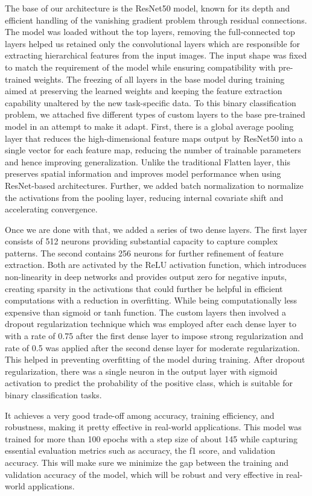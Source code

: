 \documentclass{ieeeaccess}
\begin{document}
The base of our architecture is the ResNet50 model, known for its depth and efficient handling of the vanishing gradient problem through residual connections. The model was loaded without the top layers, removing the full-connected top layers helped us retained only the convolutional layers which are responsible for extracting hierarchical features from the input images. The input shape was fixed to match the requirement of the model while ensuring compatibility with pre-trained weights. The freezing of all layers in the base model during training aimed at preserving the learned weights and keeping the feature extraction capability unaltered by the new task-specific data. To this binary classification problem, we attached five different types of custom layers to the base pre-trained model in an attempt to make it adapt. First, there is a global average pooling layer that reduces the high-dimensional feature maps output by ResNet50 into a single vector for each feature map, reducing the number of trainable parameters and hence improving generalization. Unlike the traditional Flatten layer, this preserves spatial information and improves model performance when using ResNet-based architectures. Further, we added batch normalization to normalize the activations from the pooling layer, reducing internal covariate shift and accelerating convergence. 

Once we are done with that, we added a series of two dense layers. The first layer consists of 512 neurons providing substantial capacity to capture complex patterns. The second contains 256 neurons for further refinement of feature extraction. Both are activated by the ReLU activation function, which introduces non-linearity in deep networks and provides output zero for negative inputs, creating sparsity in the activations that could further be helpful in efficient computations with a reduction in overfitting. While being computationally less expensive than sigmoid or tanh function. The custom layers then involved a dropout regularization technique which was employed after each dense layer to with a rate of 0.75 after the first dense layer to impose strong regularization and rate of 0.5 was applied after the second dense layer for moderate regularization. This helped in preventing overfitting of the model during training. After dropout regularization, there was a single neuron in the output layer with sigmoid activation to predict the probability of the positive class, which is suitable for binary classification tasks.

It achieves a very good trade-off among accuracy, training efficiency, and robustness, making it pretty effective in real-world applications. This model was trained for more than 100 epochs with a step size of about 145 while capturing essential evaluation metrics such as accuracy, the f1 score, and validation accuracy. This will make sure we minimize the gap between the training and validation accuracy of the model, which will be robust and very effective in real-world applications.
\end{document}
